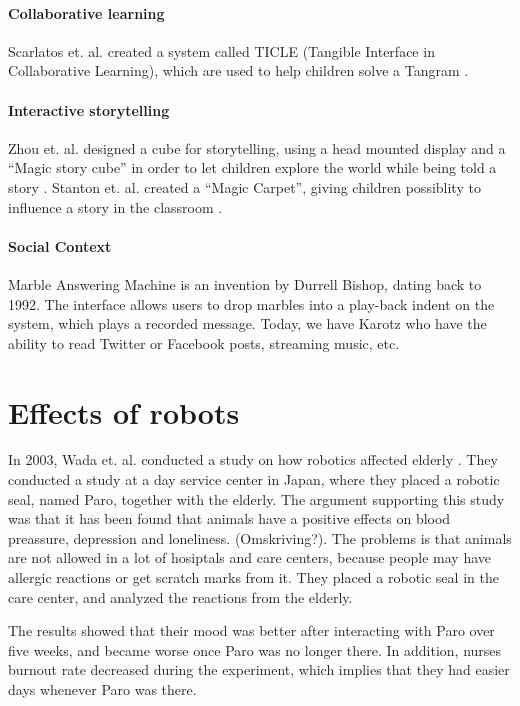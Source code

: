 \paragraph{Collaborative learning}
Scarlatos et. al. created a system called TICLE (Tangible Interface in Collaborative Learning), which are used to help children solve a Tangram \cite{scarlatos1999ticle}.  

\paragraph{Interactive storytelling}
Zhou et. al. designed a cube for storytelling, using a head mounted display and a ``Magic story cube'' in order to let children explore the world while being told a story \cite{zhou2004magic}. Stanton et. al. created a ``Magic Carpet'', giving children possiblity to influence a story in the classroom \cite{stanton2001classroom}. 
 
\paragraph{Social Context}
Marble Answering Machine is an invention by Durrell Bishop, dating back to 1992. The interface allows users to drop marbles into a play-back indent on the system, which plays a recorded message. Today, we have Karotz who have the ability to read Twitter or Facebook posts, streaming music, etc.   

\section{Effects of robots}

In 2003, Wada et. al. conducted a study on how robotics affected elderly \cite{wada2004effects}. They conducted a study at a day service center in Japan, where they placed a robotic seal, named Paro, together with the elderly. The argument supporting this study was that it has been found that animals have a positive effects on blood preassure, depression and loneliness. (Omskriving?). The problems is that animals are not allowed in a lot of hosiptals and care centers, because people may have allergic reactions or get scratch marks from it. They placed a robotic seal in the care center, and analyzed the reactions from the elderly. 

The results showed that their mood was better after interacting with Paro over five weeks, and became worse once Paro was no longer there. In addition, nurses burnout rate decreased during the experiment, which implies that they had easier days whenever Paro was there.          

